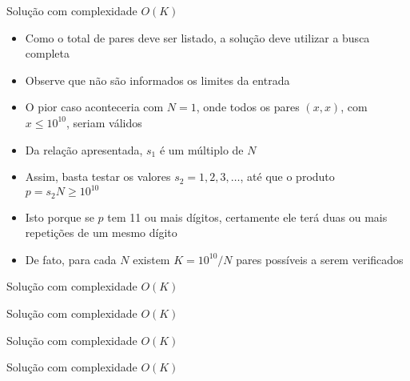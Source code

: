 \begin{frame}[fragile]{Solução com complexidade $O(K)$}

    \begin{itemize}
        \item Como o total de pares deve ser listado, a solução deve utilizar a busca completa

        \item Observe que não são informados os limites da entrada

        \item O pior caso aconteceria com $N = 1$, onde todos os pares $(x, x)$, com $x \leq 
            10^{10}$, seriam válidos

        \item Da relação apresentada, $s_1$ é um múltiplo de $N$

        \item Assim, basta testar os valores $s_2 = 1, 2, 3, \ldots$, até que o produto
            $p = s_2N \geq 10^{10}$

        \item Isto porque se $p$ tem 11 ou mais dígitos, certamente ele terá duas ou mais repetições
            de um mesmo dígito

        \item De fato, para cada $N$ existem $K = 10^{10}/N$ pares possíveis a serem verificados
   \end{itemize}

\end{frame}

\begin{frame}[fragile]{Solução com complexidade $O(K)$}
\end{frame}

\begin{frame}[fragile]{Solução com complexidade $O(K)$}
\end{frame}
\begin{frame}[fragile]{Solução com complexidade $O(K)$}
\end{frame}
\begin{frame}[fragile]{Solução com complexidade $O(K)$}
\end{frame}

